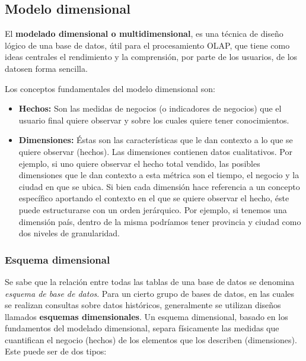 \documentclass[a4paper,11pt]{article}
\begin{document}
    
    \subsection{Modelo dimensional} \label{mod_dimensional}
    
    El \textbf{modelado dimensional o multidimensional}, es una técnica de diseño lógico de una base de datos, útil para el procesamiento OLAP, que tiene
    como ideas centrales el rendimiento y la comprensión, por parte de los usuarios, de los datosen forma sencilla.
    
    Los conceptos fundamentales del modelo dimensional son:
    
    \begin{itemize}
      \item \textbf{Hechos:} Son las medidas de negocios (o indicadores de negocios) que el usuario final quiere observar y sobre los cuales quiere tener
      conocimientos.
      \item \textbf{Dimensiones:} Éstas son las características que le dan contexto a lo que se quiere observar (hechos).
      Las dimensiones contienen datos cualitativos. Por ejemplo, si uno quiere observar el hecho total 
      vendido, las posibles dimensiones que le dan contexto a esta métrica son el tiempo, el negocio y la ciudad en que se ubica. Si bien cada dimensión hace
      referencia a un concepto específico aportando el contexto en el que se quiere observar el hecho, éste puede estructurarse con un orden jerárquico.
      Por ejemplo, si tenemos una dimensión país, dentro de la misma podríamos tener provincia y ciudad como dos niveles de granularidad. 
    \end{itemize}
    
    \subsubsection{Esquema dimensional}
    
    Se sabe que la relación entre todas las tablas de una base de datos se denomina \textit{esquema de base de datos}. Para un cierto grupo de bases de datos, en las
    cuales se realizan consultas sobre datos históricos, generalmente se utilizan diseños llamados \textbf{esquemas dimensionales}. Un esquema dimensional,
    basado en los fundamentos del modelado dimensional, separa físicamente las medidas que cuantifican el negocio (hechos) de los elementos que los describen
    (dimensiones). Este puede ser de dos tipos:
    
\end{document}
